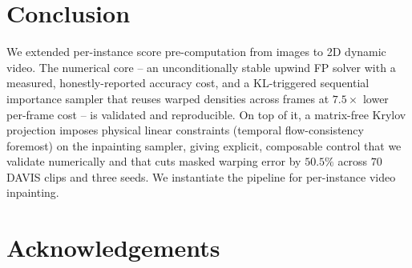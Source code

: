 \section{Conclusion}
We extended per-instance score pre-computation from images to 2D dynamic video.
The numerical core -- an unconditionally stable upwind FP solver with a measured,
honestly-reported accuracy cost, and a KL-triggered sequential importance sampler
that reuses warped densities across frames at $7.5\times$ lower per-frame cost --
is validated and reproducible. On top of it, a matrix-free Krylov projection
imposes physical linear constraints (temporal flow-consistency foremost) on the
inpainting sampler, giving explicit, composable control that we validate
numerically and that cuts masked warping error by $50.5\%$ across $70$ DAVIS
clips and three seeds. We instantiate the pipeline for per-instance video
inpainting.

\section*{Acknowledgements}





